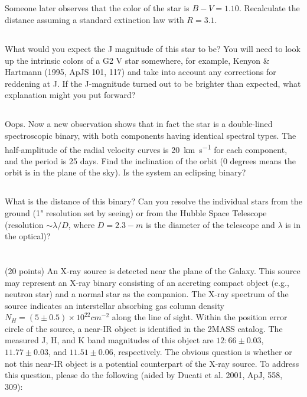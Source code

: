 \subsection{}
Someone later observes that the color of the star is $B-V = 1.10$. 
Recalculate the distance assuming a standard extinction law with $R = 3.1$.
\subsection{}
What would you expect the J magnitude of this star to be?
You will need to look up the intrinsic colors of a G2 V star somewhere, for example, Kenyon \& Hartmann (1995, ApJS 101, 117) and take into account any corrections for reddening at J.
If the J-magnitude turned out to be brighter than expected, what explanation might you put forward?
\subsection{}
Oops. Now a new observation shows that in fact the star is a double-lined spectroscopic binary, with both components having identical spectral types.
The half-amplitude of the radial velocity curves is \SI{20}{\kilo\meter\per\second} for each component, and the period is 25 days.
Find the inclination of the orbit (0 degrees means the orbit is in the plane of the sky).
Is the system an eclipsing binary?
\subsection{}
What is the distance of this binary? 
Can you resolve the individual stars from the ground (1" resolution set by seeing) or from the Hubble Space Telescope (resolution $\sim\lambda/D$, where $D = 2.3-m$ is the diameter of the telescope and $\lambda$ is in the optical)?



\section{}
(20 points) An X-ray source is detected near the plane of the Galaxy. 
This source may represent an X-ray binary consisting of an accreting compact object (e.g., neutron star) and a normal star as the companion.
The X-ray spectrum of the source indicates an interstellar absorbing gas column density $N_H = (5 \pm 0.5) \times 10^{22} cm^{-2}$ along the line of sight.
Within the position error circle of the source, a near-IR object is identified in the 2MASS catalog.
The measured J, H, and K band magnitudes of this object are
$12:66\pm0.03$, $11.77\pm0.03$, and $11.51\pm0.06$, respectively.
The obvious question is whether or not this near-IR object is a potential counterpart of the X-ray source.
To address this question, please do the following (aided by Ducati et al. 2001, ApJ, 558, 309):
